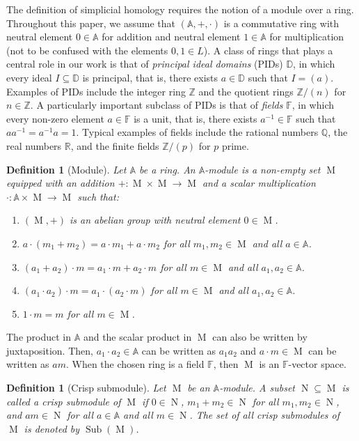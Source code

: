 \documentclass[a4paper,10pt]{article}
\newtheorem{definition}[theorem]{Definition}
\newcommand{\bba}{\mathbb{A}}
\newcommand{\bbd}{\mathbb{D}}
\newcommand{\bbf}{\mathbb{F}}
\newcommand{\bbr}{\mathbb{R}}
\newcommand{\bbz}{\mathbb{Z}}
\DeclareMathOperator{\sub}{Sub}
\DeclareMathOperator{\Mo}{M}
\DeclareMathOperator{\No}{N}
\begin{document}
The definition of simplicial homology requires the notion of a module over a ring. 
Throughout this paper, we assume that \((\bba,+,\cdot)\) is a commutative ring with neutral element \(0 \in \bba\) for addition and neutral element \(1 \in \bba\) for multiplication (not to be confused with the elements \(0,1 \in L\)). A class of rings that plays a central role in our work is that of \emph{principal ideal domains} (PIDs) \(\bbd\), in which every ideal \(I \subseteq \bbd\) is principal, that is, there exists \(a \in \bbd\) such that \(I = (a)\). 
Examples of PIDs include the integer ring \(\bbz\) and the quotient rings \(\bbz/(n)\) for \(n \in \bbz\). A particularly important subclass of PIDs is that of \emph{fields} \(\bbf\), in which every non-zero element \(a \in \bbf\) is a unit, that is, there exists \(a^{-1} \in \bbf\) such that \(aa^{-1} = a^{-1}a = 1\). Typical examples of fields include the rational numbers \(\mathbb{Q}\), the real numbers \(\bbr\), and the finite fields \(\bbz/(p)\) for \(p\) prime.

\begin{definition}[Module]
\label{def:module}
Let \(\bba\) be a ring. An \(\bba\)-module is a non-empty set \(\Mo\) equipped with an addition \(+\colon \Mo \times \Mo \to \Mo\) and a scalar multiplication \(\cdot\colon \bba \times \Mo \to \Mo\) such that:
\begin{enumerate}
\item \((\Mo,+)\) is an abelian group with neutral element \(0 \in \Mo\).
\item \(a \cdot (m_1+m_2) = a \cdot m_1 + a \cdot m_2\) for all \(m_1,m_2 \in \Mo\) and all \(a \in \bba\).
\item \((a_1+a_2) \cdot m = a_1 \cdot m + a_2 \cdot m\) for all \(m \in \Mo\) and all \(a_1,a_2 \in \bba\).
\item \((a_1\cdot a_2) \cdot m = a_1 \cdot (a_2 \cdot m)\) for all \(m \in \Mo\) and all \(a_1,a_2 \in \bba\).
\item \(1 \cdot m = m\) for all \(m \in \Mo\).
\end{enumerate}
\end{definition}

The product in \(\bba\) and the scalar product in \(\Mo\) can also be written by juxtaposition. Then, \(a_1 \cdot a_2 \in \bba\) can be written as \(a_1a_2\) and \(a\cdot m \in \Mo\) can be written as \(am\).
When the chosen ring is a field \(\bbf\), then \(\Mo\) is an \(\bbf\)-vector space.

\begin{definition}[Crisp submodule]
\label{def:submodule}
Let \(\Mo\) be an \(\bba\)-module. A subset \(\No \subseteq \Mo\) is called a \emph{crisp submodule} of \(\Mo\) if \(0 \in \No\), \(m_1+m_2 \in \No\) for all \(m_1,m_2 \in \No\), and \(am \in \No\) for all \(a \in \bba\) and all \(m \in \No\). The set of all crisp submodules of \(\Mo\) is denoted by \(\sub(\Mo)\).
\end{definition}
\end{document}
